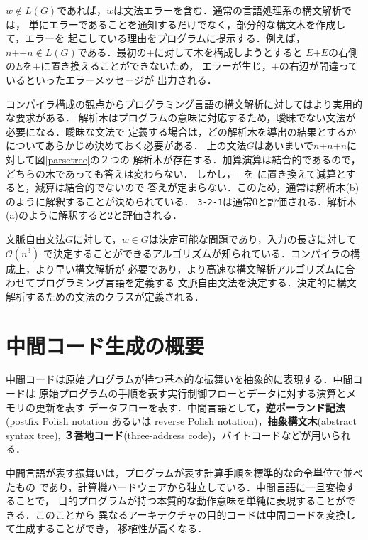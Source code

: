 \documentclass[a4j,dvipdfmx]{jbook}
\begin{document}
$w\notin L(G)$であれば，$w$は文法エラーを含む．通常の言語処理系の構文解析では，
単にエラーであることを通知するだけでなく，部分的な構文木を作成して，エラーを
起こしている理由をプログラムに提示する．例えば，$n\texttt{+}\texttt{+}n\notin
L(G)$である．最初の$\texttt{+}$に対して木を構成しようとすると
$E\texttt{+}E$の右側の$E$を$\texttt{+}$に置き換えることができないため，
エラーが生じ，$\texttt{+}$の右辺が間違っているといったエラーメッセージが
出力される．

コンパイラ構成の観点からプログラミング言語の構文解析に対してはより実用的な要求がある．
解析木はプログラムの意味に対応するため，曖昧でない文法が必要になる．曖昧な文法で
定義する場合は，どの解析木を導出の結果とするかについてあらかじめ決めておく必要がある．
上の文法$G$はあいまいで$n\texttt{+}n\texttt{+}n$に対して図\ref{parsetree}の２つの
解析木が存在する．加算演算は結合的であるので，どちらの木であっても答えは変わらない．
しかし，$\texttt{+}$を$\texttt{-}$に置き換えて減算とすると，減算は結合的でないので
答えが定まらない．このため，通常は解析木(b)のように解釈することが決められている．
\texttt{3-2-1}は通常0と評価される．解析木(a)のように解釈すると2と評価される．

文脈自由文法$G$に対して，$w\in G$は決定可能な問題であり，入力の長さに対して$\mathcal{O}(n^3)$
で決定することができるアルゴリズムが知られている．コンパイラの構成上，より早い構文解析が
必要であり，より高速な構文解析アルゴリズムに合わせてプログラミング言語を定義する
文脈自由文法を決定する．決定的に構文解析するための文法のクラスが定義される．

\section{中間コード生成の概要}

中間コードは原始プログラムが持つ基本的な振舞いを抽象的に表現する．中間コードは
原始プログラムの手順を表す実行制御フローとデータに対する演算とメモリの更新を表す
データフローを表す．中間言語として，{\bf 逆ポーランド記法}(postfix Polish notation
あるいは reverse Polish notation)，{\bf 抽象構文木}(abstract syntax tree), 
{\bf ３番地コード}(three-address code)，バイトコードなどが用いられる．

中間言語が表す振舞いは，プログラムが表す計算手順を標準的な命令単位で並べたもの
であり，計算機ハードウェアから独立している．中間言語に一旦変換することで，
目的プログラムが持つ本質的な動作意味を単純に表現することができる．このことから
異なるアーキテクチャの目的コードは中間コードを変換して生成することができ，
移植性が高くなる．
\end{document}
